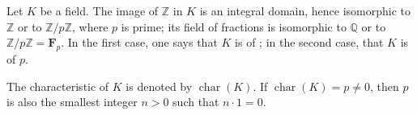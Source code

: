 Let $K$ be a field. The image of $\mathbb{Z}$ in $K$ is an integral domain, hence isomorphic to $\mathbb{Z}$ or to $\mathbb{Z}/p\mathbb{Z}$, where $p$ is prime; its field of fractions is isomorphic to $\mathbb{Q}$ or to $\mathbb{Z}/p\mathbb{Z} = \mathbf{F}_p$. In the first case, one says that $K$ is of ; in the second case, that $K$ is of  $p$.

The characteristic of $K$ is denoted by $\operatorname{char}(K)$. If $\operatorname{char}(K) = p \neq 0$, then $p$ is also the smallest integer $n > 0$ such that $n \cdot 1 = 0$.
